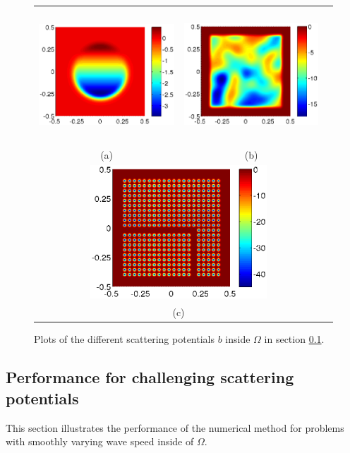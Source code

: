 \documentclass[11pt,final]{amsart}
\theoremstyle{definition}
\numberwithin{remark}{section}
\numberwithin{definition}{section}
\numberwithin{pro}{section}
\begin{document}
\begin{figure}[ht]
 \begin{tabular}{ccc}
\includegraphics[height=50mm]{lens_bump.eps}& \includegraphics[height=50mm]{random_bump.eps}\\
(a)& (b)\\
\multicolumn{2}{c}{\includegraphics[height=50mm]{crystal_bump.eps}}\\
\multicolumn{2}{c}{(c)}\\
   \end{tabular}
\caption{\label{fig:bs} Plots of the different scattering potentials $b$
inside $\Omega$ in section \ref{sec:conv}.}
\end{figure}


\subsection{Performance for challenging scattering potentials}
\label{sec:conv}
This section illustrates the performance of the numerical method for
problems with smoothly varying wave speed inside of $\Omega$.
\end{document}

